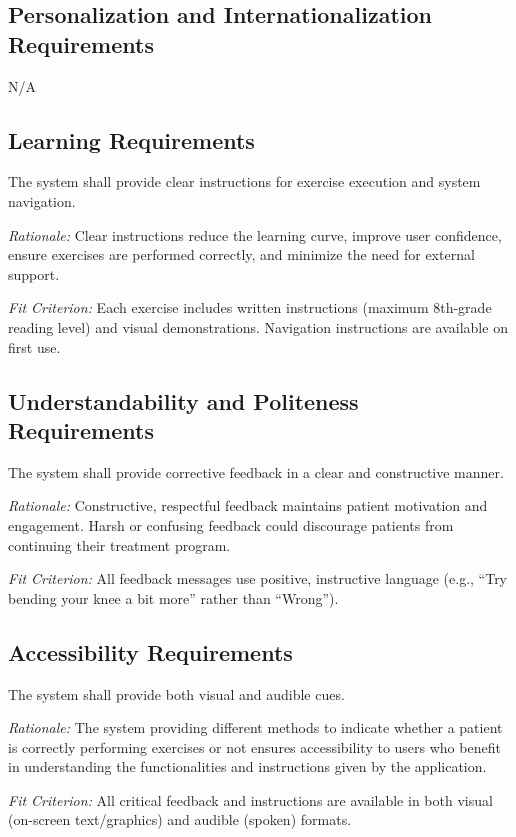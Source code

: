\documentclass[12pt]{article}
\newcommand{\rationale}[1]{\par\emph{Rationale:} #1}
\newcommand{\fitcrit}[1]{\par\emph{Fit Criterion:} #1}
\begin{document}
\subsection{Personalization and Internationalization Requirements}
N/A

\subsection{Learning Requirements}
\begin{reqlist}
	\item[UHR-LRN 1.] The system shall provide clear instructions for exercise execution and system navigation.
	\rationale{Clear instructions reduce the learning curve, improve user confidence, ensure exercises are performed correctly, and minimize the need for external support.}
	\fitcrit{Each exercise includes written instructions (maximum 8th-grade reading level) and visual demonstrations. Navigation instructions are available on first use.}
\end{reqlist}

\subsection{Understandability and Politeness Requirements}
\begin{reqlist}
	\item[UHR-UPL 1.] The system shall provide corrective feedback in a clear and constructive manner.
	\rationale{Constructive, respectful feedback maintains patient motivation and engagement. Harsh or confusing feedback could discourage patients from continuing their treatment program.}
	\fitcrit{All feedback messages use positive, instructive language (e.g., ``Try bending your knee a bit more'' rather than ``Wrong'').}
\end{reqlist}

\subsection{Accessibility Requirements}
\begin{reqlist}
	\item[UHR-AR 1.] The system shall provide both visual and audible cues.
	\rationale{The system providing different methods to indicate whether a patient is correctly performing exercises or not ensures accessibility to users who benefit in understanding the functionalities and instructions given by the application.}
	\fitcrit{All critical feedback and instructions are available in both visual (on-screen text/graphics) and audible (spoken) formats.}
\end{reqlist}
\end{document}
